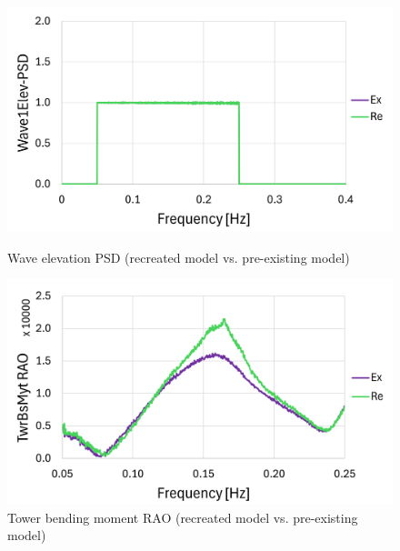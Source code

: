 \documentclass[a4paper, 11pt]{article}
\begin{document}
\begin{figure}[H]
    \begin{minipage}{0.48\textwidth}
        \centering
        \includegraphics[width=1\textwidth]{2.6_wave_mine_1.png}
        \caption{\small Wave elevation PSD (recreated model vs. pre-existing model)} 
        \label{fig:2.6_wave_mine_recreated}
    \end{minipage}
    \hfill
    \begin{minipage}{0.49\textwidth}
        \centering
        \vspace{-0.3cm}
        \includegraphics[width=1\textwidth]{2.6_twr_mine_1.png}
        \caption{\small Tower bending moment RAO (recreated model vs. pre-existing model)}
        \label{fig:2.6_twr_mine_recreated}
    \end{minipage}
\end{figure}
\end{document}
